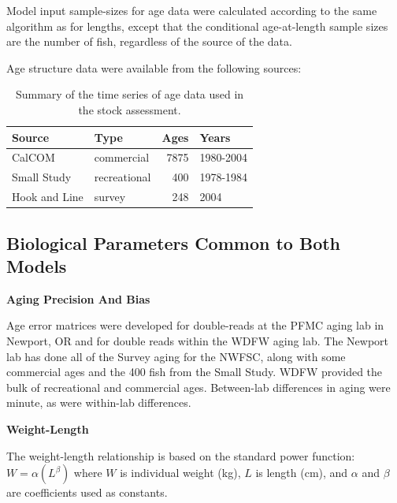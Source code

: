\documentclass[12pt,]{article}
\begin{document}
Model input sample-sizes for age data were calculated according to the
same algorithm as for lengths, except that the conditional age-at-length
sample sizes are the number of fish, regardless of the source of the
data.

Age structure data were available from the following sources:

\begin{table}[ht]
\centering
\caption{Summary of the
                                              time series of age data used in the stock
                                              assessment.} 
\label{tab:Age_sources}
\begin{tabular}{llrl}
  \hline
Source & Type & Ages & Years \\ 
  \hline
CalCOM & commercial & 7875 & 1980-2004 \\ 
  Small Study & recreational & 400 & 1978-1984 \\ 
  Hook and Line & survey & 248 & 2004 \\ 
   \hline
\end{tabular}
\end{table}

\subsection{Biological Parameters Common to Both
Models}\label{biological-parameters-common-to-both-models}

\vspace{.5cm}

\textbf{Aging Precision And Bias}

Age error matrices were developed for double-reads at the PFMC aging lab
in Newport, OR and for double reads within the WDFW aging lab. The
Newport lab has done all of the Survey aging for the NWFSC, along with
some commercial ages and the 400 fish from the Small Study. WDFW
provided the bulk of recreational and commercial ages. Between-lab
differences in aging were minute, as were within-lab differences.

\vspace{.5cm}

\textbf{Weight-Length}

The weight-length relationship is based on the standard power function:
\(W = \alpha(L^\beta)\) where \(W\) is individual weight (kg), \(L\) is
length (cm), and \(\alpha\) and \(\beta\) are coefficients used as
constants.
\end{document}

